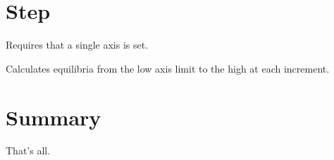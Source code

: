 \documentclass[12pt]{article}
\begin{document}
\section{Step }

Requires that a single axis is set.

Calculates equilibria from the low axis limit to the high at each
increment.  

\section{Summary }

That's all.
\end{document}
